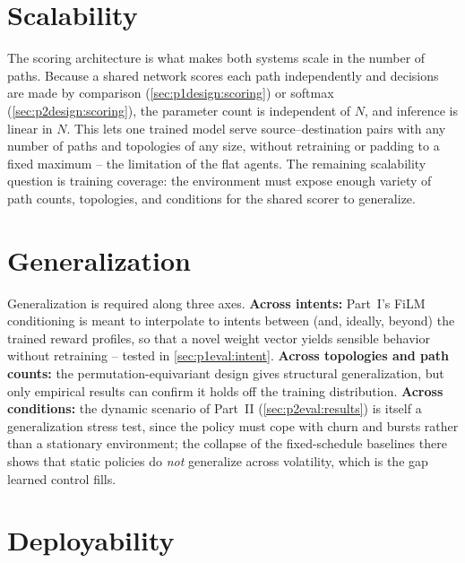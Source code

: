 \section{Scalability}
\label{sec:analysis:scalability}

The scoring architecture is what makes both systems scale in the number of paths. Because a shared network
scores each path independently and decisions are made by comparison (\cref{sec:p1design:scoring}) or softmax
(\cref{sec:p2design:scoring}), the parameter count is independent of $N$, and inference is linear in $N$.
This lets one trained model serve source--destination pairs with any number of paths and topologies of any
size, without retraining or padding to a fixed maximum -- the limitation of the flat agents. The remaining
scalability question is training coverage: the environment must expose enough variety of path counts,
topologies, and conditions for the shared scorer to generalize. 

\section{Generalization}
\label{sec:analysis:generalization}

Generalization is required along three axes. \textbf{Across intents:} Part~I's FiLM conditioning is meant to
interpolate to intents between (and, ideally, beyond) the trained reward profiles, so that a novel weight
vector yields sensible behavior without retraining -- tested in \cref{sec:p1eval:intent}. \textbf{Across
topologies and path counts:} the permutation-equivariant design gives structural generalization, but only
empirical results can confirm it holds off the training distribution. \textbf{Across conditions:} the
dynamic scenario of Part~II (\cref{sec:p2eval:results}) is itself a generalization stress test, since the
policy must cope with churn and bursts rather than a stationary environment; the collapse of the
fixed-schedule baselines there shows that static policies do \emph{not} generalize across volatility, which
is the gap learned control fills. 

\section{Deployability}
\label{sec:analysis:deployability}

